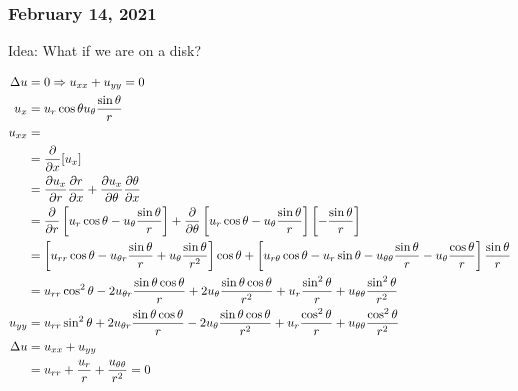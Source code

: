 \documentclass{article}
\begin{document}
%

\subsubsection*{February 14, 2021}

Idea: What if we are on a disk?

\begin{align}
  \Delta u  & = 0 \Rightarrow u_{xx} + u_{yy} = 0\\
  u_x       & = u_r \cos \theta u_\theta \frac{\sin \theta}{r}\\
  u_{xx}    & = \\
  & = \frac{\partial}{\partial x} [u_x]\\
  & = \frac{\partial u_x}{\partial r} \frac{\partial r}{\partial x} + \frac{\partial u_x}{\partial \theta} \frac{\partial \theta}{\partial x}\\
  & =
  \frac{\partial}{\partial r}
  \left[u_r \cos \theta -u_\theta \frac{\sin \theta}{r}\right] +
  \frac{\partial}{\partial \theta}
  \left[ u_r \cos \theta - u_\theta \frac{\sin \theta}{r} \right]
  \left[ - \frac{\sin \theta}{r}\right]\\
  & =
  \left[ u_{rr} \cos \theta - u_{\theta r} \frac{\sin \theta}{r} + u_\theta \frac{\sin \theta}{r^2} \right] \cos \theta +
  \left[ u_{r \theta} \cos \theta - u_r \sin \theta - u_{\theta \theta} \frac{\sin \theta}{r} - u_\theta \frac{\cos \theta}{r} \right]
  \frac{\sin \theta}{r}\\
  & =
  u_{rr} \cos^2 \theta
  - 2 u_{\theta r} \frac{\sin \theta \cos \theta}{r}
  + 2 u_\theta \frac{\sin \theta \cos \theta}{r^2}
  + u_r \frac{\sin^2 \theta}{r} + u_{\theta \theta} \frac{\sin^2 \theta}{r^2}\\
  u_{yy} &
  = u_{rr} \sin^2 \theta
  + 2u_{\theta r} \frac{\sin \theta \cos \theta}{r}
  - 2u_\theta \frac{\sin \theta \cos \theta}{r^2}
  + u_r \frac{\cos^2 \theta}{r}
  + u_{\theta \theta} \frac{\cos^2 \theta}{r^2}\\
  \Delta u & = u_{xx} + u_{yy} \\ &
  = u_{rr}
  + \frac{u_r}{r}
  + \frac{u_{\theta \theta}}{r^2} = 0
\end{align}

\end{document}
